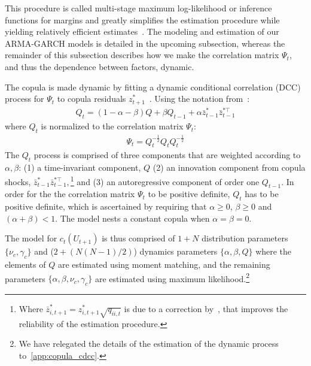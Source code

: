This procedure is called multi-stage maximum log-likelihood or inference functions for margins and greatly simplifies the estimation procedure while yielding relatively efficient estimates~\autocite{Patton2006,Joe1997}. The modeling and estimation of our ARMA-GARCH models is detailed in the upcoming subsection, whereas the remainder of this subsection describes how we make the correlation matrix $\Psi_t$, and thus the dependence between factors, dynamic.

The copula is made dynamic by fitting a dynamic conditional correlation (DCC) process for $\Psi_t$ to copula residuals $z_{t+1}^*$~\autocite{Engle2002}. Using the notation from~\textcite{ChristoffersenLanglois2013}:
\begin{align}
  Q_t = (1 - \alpha - \beta) Q
    + \beta Q_{t-1}
    + \alpha \bar{z}_{t-1}^* \bar{z}_{t-1}^{*\top}
  \label{eq:copula_cdcc}
\end{align}
where $Q_t$ is normalized to the correlation matrix $\Psi_t$:
\begin{align}
  \Psi_t = Q_t^{-\frac{1}{2}} Q_t Q_t^{-\frac{1}{2}}
  \label{eq:copula_cdcc_psi}
\end{align}
The $Q_t$ process is comprised of three components that are weighted according to $\alpha, \beta$: (1) a time-invariant component, $Q$ (2) an innovation component from copula shocks, $\bar{z}_{t-1}^{*} \bar{z}_{t-1}^{*\top},$\footnote{Where $\bar{z}_{i,t+1}^* = z_{i,t+1}^* \sqrt{q_{ii,t}}$ is due to a correction by~\textcite{Aielli2013}, that improves the reliability of the estimation procedure.} and (3) an autoregressive component of order one $Q_{t-1}$. In order for the the correlation matrix $\Psi_t$ to be positive definite, $Q_t$ has to be positive definite, which is ascertained by requiring that $\alpha \geq 0$, $\beta \geq 0$ and $(\alpha + \beta) < 1$. The model nests a constant copula when $\alpha = \beta = 0$.

The model for $c_t(U_{t+1})$ is thus comprised of $1 + N$ distribution parameters $\{\nu_c, \gamma_c\}$ and (${2 + (N(N-1) / 2)}$) dynamics parameters $\{\alpha, \beta, Q\}$ where the elements of $Q$ are estimated using moment matching, and the remaining parameters $\{\alpha, \beta, \nu_c, \gamma_c\}$ are estimated using maximum likelihood.\footnote{We have relegated the details of the estimation of the dynamic process to~\autoref{app:copula_cdcc}.}

